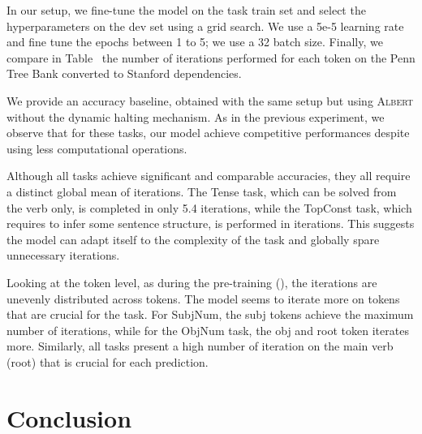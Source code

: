 In our setup, we fine-tune the model on the task train set and select the hyperparameters on the dev set using a grid search. We use a 5e-5 learning rate and fine tune the epochs between 1 to 5; we use a 32 batch size.
Finally, we %
compare in Table~ the number of iterations performed for each token 
on the Penn Tree Bank \parencite{marcus_94} converted to Stanford dependencies.

We provide an accuracy baseline, obtained with the same setup but using \textsc{Albert}  without the dynamic halting mechanism. As in the previous experiment, we observe that for these tasks, our model achieve competitive performances despite using less computational operations.

Although all tasks achieve significant and comparable accuracies, they all require a distinct global mean of iterations. The Tense task, which can be solved from the verb only, is completed in only 5.4 iterations, while the TopConst task, which requires to infer some sentence structure, is performed in  iterations. This suggests the model can adapt itself to the complexity of the task and globally spare unnecessary iterations. 

Looking at the token level, as during the pre-training (), the iterations are unevenly distributed across tokens. The model seems to iterate more on tokens that are crucial for the task. For SubjNum, the subj tokens achieve the maximum number of iterations, while for the ObjNum task, the obj and root token iterates more. Similarly, all tasks present a high number of iteration on the main verb (root) that is crucial for each prediction.

\section{Conclusion}

